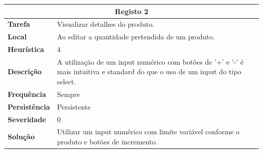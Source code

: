 \documentclass[a4paper,12pt]{article}
\begin{document}
\begin{center}
\newpage
    \begin{table}[h!]
        \centering
        \begin{tabular}{|m{3cm}|m{12cm}|}
        \hline
        \multicolumn{2}{|c|}{\textbf{Registo 2}} \\ \hline
        \textbf{Tarefa}       & Visualizar detalhes do produto. \\ \hline
        \textbf{Local}        & Ao editar a quantidade pretendida de um produto. \\ \hline
        \textbf{Heurística}   & 4 \\ \hline
        \textbf{Descrição}    & A utilização de um input numérico com botões de '+' e '-' é mais intuitiva e standard do que o uso de um input do tipo select. \\ \hline
        \textbf{Frequência}   & Sempre \\ \hline
        \textbf{Persistência} & Persistente \\ \hline
        \textbf{Severidade}   & 0 \\ \hline
        \textbf{Solução}      & Utilizar um input numérico com limite variável conforme o produto e botões de incremento.\\ \hline
        \end{tabular}
    \end{table}
    

\end{center}
\end{document}
